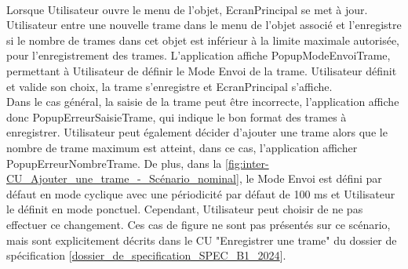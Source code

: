 \\
Lorsque Utilisateur ouvre le menu de l'objet, EcranPrincipal se met à jour. Utilisateur entre une nouvelle trame dans le menu de l'objet associé et l'enregistre si le nombre de trames dans cet objet est inférieur à la limite maximale autorisée, pour l'enregistrement des trames. L'application {\nomApplication} affiche PopupModeEnvoiTrame, permettant à Utilisateur de définir le Mode Envoi de la trame. Utilisateur définit et valide son choix, la trame s'enregistre et EcranPrincipal s'affiche.\\

Dans le cas général, la saisie de la trame peut être incorrecte, l'application {\nomApplication} affiche donc PopupErreurSaisieTrame, qui indique le bon format des trames à enregistrer. Utilisateur peut également décider d'ajouter une trame alors que le nombre de trame maximum est atteint, dans ce cas, l'application {\nomApplication} afficher PopupErreurNombreTrame. De plus, dans la \autoref{fig:inter-CU_Ajouter_une_trame_-_Scénario_nominal}, le Mode Envoi est défini par défaut en mode cyclique avec une périodicité par défaut de 100 ms et Utilisateur le définit en mode ponctuel. Cependant, Utilisateur peut choisir de ne pas effectuer ce changement. Ces cas de figure ne sont pas présentés sur ce scénario, mais sont explicitement décrits dans le CU "Enregistrer une trame" du dossier de spécification [\hyperref[SPEC]{dossier\_de\_specification\_SPEC\_B1\_2024}].